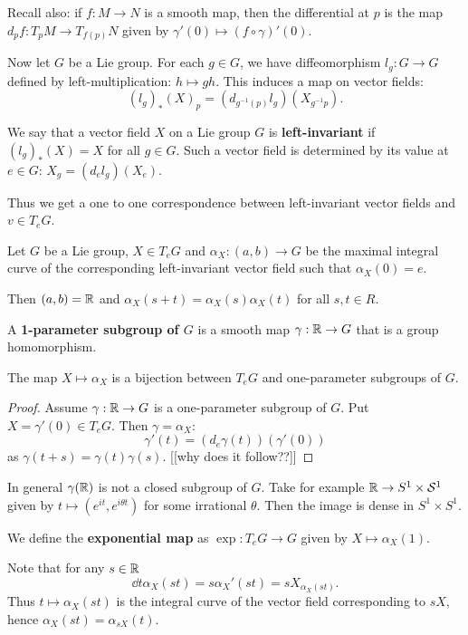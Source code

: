 \documentclass[11pt, english]{article}
\begin{document}
Recall also: if $f:M \to N$ is a smooth map, then the differential at $p$ is the map  $d_pf:T_pM \to T_{f(p)}N$ given by $\gamma'(0) \mapsto (f \circ \gamma)'(0)$. 

Now let $G$ be a Lie group. For each $g \in G$, we have diffeomorphism $l_g:G \to G$ defined by left-multiplication: $h \mapsto gh$. This induces a map on vector fields:
$$
(l_g)_\ast(X)_p = (d_{g^{-1}(p)} l_g)(X_{g^{-1}p}).
$$

We say that a vector field $X$ on a Lie group $G$ is \textbf{left-invariant} if $(l_g)_\ast(X)=X$ for all $g \in G$. Such a vector field is determined by its value at $e \in G$: $X_g = (d_e l_g)(X_e)$.

Thus we get a one to one correspondence between left-invariant vector fields and $v \in T_eG$.
 
\begin{prop}
 Let $G$ be a Lie group, $X \in T_eG$ and $\alpha_X:(a,b) \to G$ be the maximal integral curve of the corresponding left-invariant vector field such that $\alpha_X(0)=e$.

Then $(a,b)=\mathbb{R}$ and $\alpha_X(s+t) = \alpha_X(s)\alpha_X(t)$ for all $s,t \in R$.
\end{prop}

A \textbf{1-parameter subgroup of $G$} is a smooth map $\gamma:\mathbb{R} \to G$ that is a group homomorphism.

\begin{corr}
 The map $X \mapsto \alpha_X$ is a bijection between $T_eG$ and one-parameter subgroups of $G$.
\end{corr}
\begin{proof}
 Assume $\gamma:\mathbb{R} \to G$ is a one-parameter subgroup of $G$. Put $X = \gamma'(0) \in T_eG$. Then $\gamma = \alpha_X$:
$$
\gamma'(t) = (d_e \gamma(t))(\gamma'(0))
$$
as $\gamma(t+s)=\gamma(t)\gamma(s)$. [[why does it follow??]]
\end{proof}

\begin{remark}
 In general $\gamma(\mathbb{R})$ is not a closed subgroup of $G$. Take for example $\mathbb{R} \to S^1 \times \mathcal{S}^1$ given by $t \mapsto (e^{it},e^{i\theta t})$ for some irrational $\theta$. Then the image is dense in $S^1 \times S^1$.
\end{remark}

We define the \textbf{exponential map} as $\exp:T_e G \to G$ given by $X \mapsto \alpha_X(1)$. 

Note that for any $s \in \mathbb{R}$
$$
\dd{}{t} \alpha_X (st) = s \alpha_X'(st) = s X_{\alpha_X(st)}.
$$
Thus $t \mapsto \alpha_X(st)$ is the integral curve of the vector field corresponding to $sX$, hence $\alpha_X(st)= \alpha_{sX}(t)$. 
\end{document}
